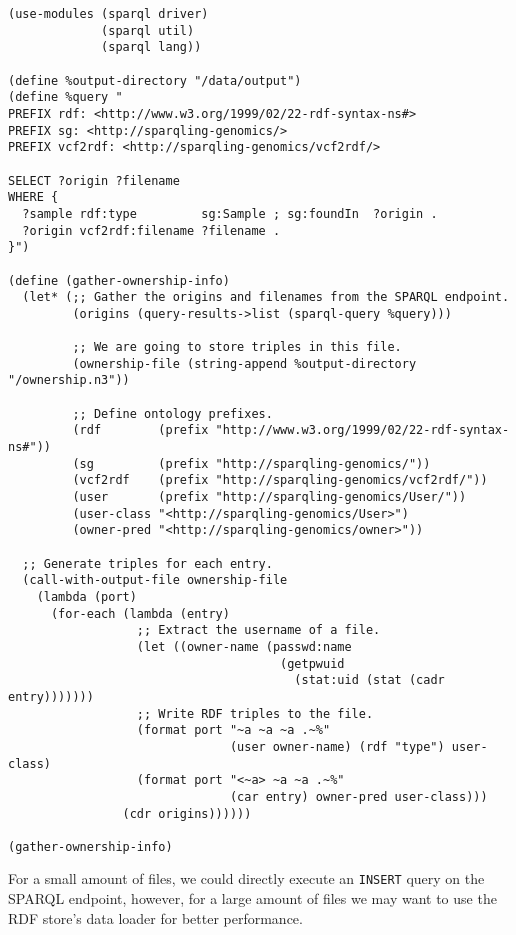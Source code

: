 \begin{siderules}
\begin{verbatim}
(use-modules (sparql driver)
             (sparql util)
             (sparql lang))

(define %output-directory "/data/output")
(define %query "
PREFIX rdf: <http://www.w3.org/1999/02/22-rdf-syntax-ns#>
PREFIX sg: <http://sparqling-genomics/>
PREFIX vcf2rdf: <http://sparqling-genomics/vcf2rdf/>

SELECT ?origin ?filename
WHERE {
  ?sample rdf:type         sg:Sample ; sg:foundIn  ?origin .
  ?origin vcf2rdf:filename ?filename .
}")

(define (gather-ownership-info)
  (let* (;; Gather the origins and filenames from the SPARQL endpoint.
         (origins (query-results->list (sparql-query %query)))

         ;; We are going to store triples in this file.
         (ownership-file (string-append %output-directory "/ownership.n3"))

         ;; Define ontology prefixes.
         (rdf        (prefix "http://www.w3.org/1999/02/22-rdf-syntax-ns#"))
         (sg         (prefix "http://sparqling-genomics/"))
         (vcf2rdf    (prefix "http://sparqling-genomics/vcf2rdf/"))
         (user       (prefix "http://sparqling-genomics/User/"))
         (user-class "<http://sparqling-genomics/User>")
         (owner-pred "<http://sparqling-genomics/owner>"))

  ;; Generate triples for each entry.
  (call-with-output-file ownership-file
    (lambda (port)
      (for-each (lambda (entry)
                  ;; Extract the username of a file.
                  (let ((owner-name (passwd:name
                                      (getpwuid
                                        (stat:uid (stat (cadr entry)))))))
                  ;; Write RDF triples to the file.
                  (format port "~a ~a ~a .~%"
                               (user owner-name) (rdf "type") user-class)
                  (format port "<~a> ~a ~a .~%"
                               (car entry) owner-pred user-class)))
                (cdr origins))))))

(gather-ownership-info)
\end{verbatim}
\end{siderules}

  For a small amount of files, we could directly execute an \texttt{INSERT}
  query on the SPARQL endpoint, however, for a large amount of files we may
  want to use the RDF store's data loader for better performance.


